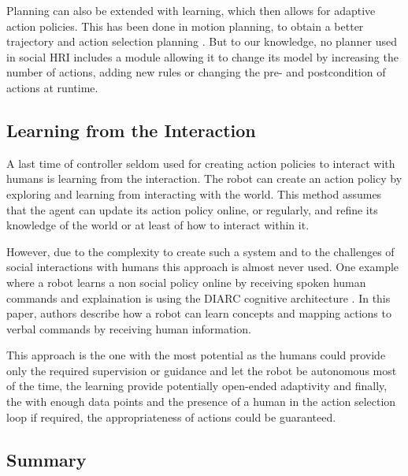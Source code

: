     
    Planning can also be extended with learning, which then allows for adaptive action policies. This has been done in motion planning, to obtain a better trajectory \citep{jain2013learning,beetz2004rpllearn} and action selection planning \citep{kirsch2009robot}. But to our knowledge, no planner used in social HRI includes a module allowing it to change its model by increasing the number of actions, adding new rules or changing the pre- and postcondition of actions at runtime.

\subsection{Learning from the Interaction}

	A last time of controller seldom used for creating action policies to interact with humans is learning from the interaction. The robot can create an action policy by exploring and learning from interacting with the world. This method assumes that the agent can update its action policy online, or regularly, and refine its knowledge of the world or at least of how to interact within it. 
	
	However, due to the complexity to create such a system and to the challenges of social interactions with humans this approach is almost never used. One example where a robot learns a non social policy online by receiving spoken human commands and explaination is using the DIARC cognitive architecture \cite{scheutz2017spoken}. In this paper, authors describe how a robot can learn concepts and mapping actions to verbal commands by receiving human information.

	This approach is the one with the most potential as the humans could provide only the required supervision or guidance and let the robot be autonomous most of the time, the learning provide potentially open-ended adaptivity and finally, the with enough data points and the presence of a human in the action selection loop if required, the appropriateness of actions could be guaranteed.

	
\subsection{Summary}

